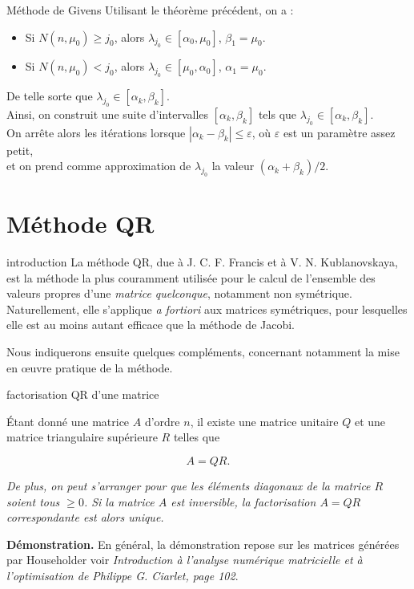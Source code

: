 \documentclass[french, 10pt]{beamer}
\theoremstyle{definition}
\begin{document}
\begin{frame}{Méthode de Givens}
	Utilisant le théorème précédent, on a : \\
	\begin{itemize}
		\item Si \( N(n, \mu_0) \geq j_0 \), alors \( \lambda_{j_0} \in [\alpha_0, \mu_0] \), \( \beta_1 = \mu_0 \). \\
		\item Si \( N(n, \mu_0) < j_0 \), alors \( \lambda_{j_0} \in [\mu_0, \alpha_0] \), \( \alpha_1 = \mu_0 \).
	\end{itemize}
	
	De telle sorte que \( \lambda_{j_0} \in [\alpha_k, \beta_k] \). \\
	Ainsi, on construit une suite d’intervalles \( [\alpha_k, \beta_k] \) tels que \( \lambda_{j_0} \in [\alpha_k, \beta_k] \). \\
	On arrête alors les itérations lorsque \( |\alpha_k - \beta_k| \leq \varepsilon \), où \( \varepsilon \) est un paramètre assez petit, \\
	et on prend comme approximation de \( \lambda_{j_0} \) la valeur \( (\alpha_k + \beta_k)/2 \).
\end{frame}

\section{Méthode QR}
\begin{frame}{introduction \cite{ciarlet2006introduction}}
	La méthode QR, due à J. C. F. Francis et à V. N. Kublanovskaya, est la méthode la plus couramment utilisée pour le calcul de l’ensemble des valeurs propres d’une \textit{matrice quelconque}, notamment non symétrique. Naturellement, elle s’applique \textit{a fortiori} aux matrices symétriques, pour lesquelles elle est au moins autant efficace que la méthode de Jacobi.
	
	Nous indiquerons ensuite quelques compléments, concernant notamment la mise en œuvre pratique de la méthode.
\end{frame}
\begin{frame}{factorisation QR d’une matrice}
	\begin{theorem}
		Étant donné une matrice \( A \) d’ordre \( n \), il existe une matrice unitaire \( Q \) et une matrice triangulaire supérieure \( R \) telles que  
		
		\[
		A = QR.
		\]
		
		\textit{De plus, on peut s’arranger pour que les éléments diagonaux de la matrice \( R \) soient tous \( \geq 0 \). Si la matrice \( A \) est inversible, la factorisation \( A = QR \) correspondante est alors unique.}
	\end{theorem}
	\textbf{Démonstration.} En général, la démonstration repose sur les matrices générées par Householder voir \textit{Introduction à l'analyse numérique matricielle et à l'optimisation de Philippe G. Ciarlet, page 102}.
\end{frame}
\end{document}
